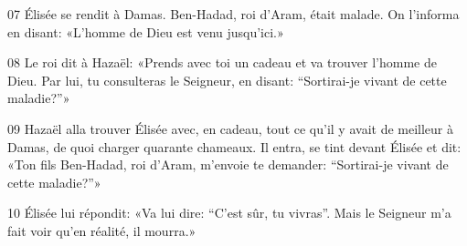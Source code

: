 
07 Élisée se rendit à Damas. Ben-Hadad, roi d’Aram, était malade. On l’informa en disant: «L’homme de Dieu est venu jusqu’ici.»

08 Le roi dit à Hazaël: «Prends avec toi un cadeau et va trouver l’homme de Dieu. Par lui, tu consulteras le Seigneur, en disant: “Sortirai-je vivant de cette maladie?”»

09 Hazaël alla trouver Élisée avec, en cadeau, tout ce qu’il y avait de meilleur à Damas, de quoi charger quarante chameaux. Il entra, se tint devant Élisée et dit: «Ton fils Ben-Hadad, roi d’Aram, m’envoie te demander: “Sortirai-je vivant de cette maladie?”»

10 Élisée lui répondit: «Va lui dire: “C’est sûr, tu vivras”. Mais le Seigneur m’a fait voir qu’en réalité, il mourra.»